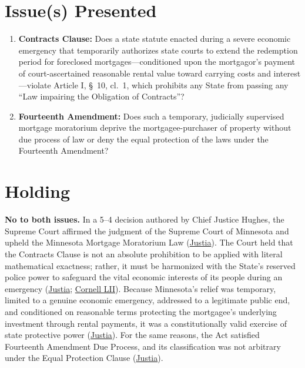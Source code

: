 \documentclass[12pt]{article}
\begin{document}
\section{Issue(s) Presented}

\begin{enumerate}
  \item \textbf{Contracts Clause:} Does a state statute enacted during a severe economic emergency that temporarily authorizes state courts to extend the redemption period for foreclosed mortgages---conditioned upon the mortgagor's payment of court-ascertained reasonable rental value toward carrying costs and interest---violate Article I, \S\ 10, cl.\ 1, which prohibits any State from passing any ``Law impairing the Obligation of Contracts''?
  \item \textbf{Fourteenth Amendment:} Does such a temporary, judicially supervised mortgage moratorium deprive the mortgagee-purchaser of property without due process of law or deny the equal protection of the laws under the Fourteenth Amendment?
\end{enumerate}

\section{Holding}

\textbf{No to both issues.} In a 5--4 decision authored by Chief Justice Hughes, the Supreme Court affirmed the judgment of the Supreme Court of Minnesota and upheld the Minnesota Mortgage Moratorium Law (\href{https://supreme.justia.com/cases/federal/us/290/398/}{Justia}). The Court held that the Contracts Clause is not an absolute prohibition to be applied with literal mathematical exactness; rather, it must be harmonized with the State's reserved police power to safeguard the vital economic interests of its people during an emergency (\href{https://supreme.justia.com/cases/federal/us/290/398/}{Justia}; \href{https://www.law.cornell.edu/constitution-conan/article-1/section-10/clause-1/blaisdell-case-and-state-modifications-to-private-contracts}{Cornell LII}). Because Minnesota's relief was temporary, limited to a genuine economic emergency, addressed to a legitimate public end, and conditioned on reasonable terms protecting the mortgagee's underlying investment through rental payments, it was a constitutionally valid exercise of state protective power (\href{https://supreme.justia.com/cases/federal/us/290/398/}{Justia}). For the same reasons, the Act satisfied Fourteenth Amendment Due Process, and its classification was not arbitrary under the Equal Protection Clause (\href{https://supreme.justia.com/cases/federal/us/290/398/}{Justia}).
\end{document}
